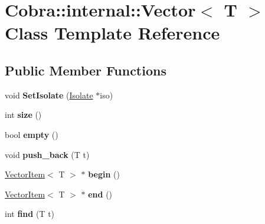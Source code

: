 \hypertarget{class_cobra_1_1internal_1_1_vector}{\section{Cobra\+:\+:internal\+:\+:Vector$<$ T $>$ Class Template Reference}
\label{class_cobra_1_1internal_1_1_vector}
}
\subsection*{Public Member Functions}
\begin{DoxyCompactItemize}
\item 
\hypertarget{class_cobra_1_1internal_1_1_vector_a0f3647af118fe7bf38a98cf0b4f6f160}{void {\bfseries Set\+Isolate} (\hyperlink{class_cobra_1_1internal_1_1_isolate}{Isolate} $\ast$iso)}\label{class_cobra_1_1internal_1_1_vector_a0f3647af118fe7bf38a98cf0b4f6f160}

\item 
\hypertarget{class_cobra_1_1internal_1_1_vector_a3e5204a5756624f33741a9ba2e127676}{int {\bfseries size} ()}\label{class_cobra_1_1internal_1_1_vector_a3e5204a5756624f33741a9ba2e127676}

\item 
\hypertarget{class_cobra_1_1internal_1_1_vector_a78dd0e9a4a92a580443906339ec33d65}{bool {\bfseries empty} ()}\label{class_cobra_1_1internal_1_1_vector_a78dd0e9a4a92a580443906339ec33d65}

\item 
\hypertarget{class_cobra_1_1internal_1_1_vector_a6f8e4bc4c2704ae863c9328e7740e913}{void {\bfseries push\+\_\+back} (T t)}\label{class_cobra_1_1internal_1_1_vector_a6f8e4bc4c2704ae863c9328e7740e913}

\item 
\hypertarget{class_cobra_1_1internal_1_1_vector_ac14842484dc52b1ac59ebda8b97cb71f}{\hyperlink{class_cobra_1_1internal_1_1_vector_item}{Vector\+Item}$<$ T $>$ $\ast$ {\bfseries begin} ()}\label{class_cobra_1_1internal_1_1_vector_ac14842484dc52b1ac59ebda8b97cb71f}

\item 
\hypertarget{class_cobra_1_1internal_1_1_vector_ae0268bb4f625a28b412523852e42f97f}{\hyperlink{class_cobra_1_1internal_1_1_vector_item}{Vector\+Item}$<$ T $>$ $\ast$ {\bfseries end} ()}\label{class_cobra_1_1internal_1_1_vector_ae0268bb4f625a28b412523852e42f97f}

\item 
\hypertarget{class_cobra_1_1internal_1_1_vector_a5ede808fef71b86c64ecf6f5ab2d1396}{int {\bfseries find} (T t)}\label{class_cobra_1_1internal_1_1_vector_a5ede808fef71b86c64ecf6f5ab2d1396}


\end{DoxyCompactItemize}
